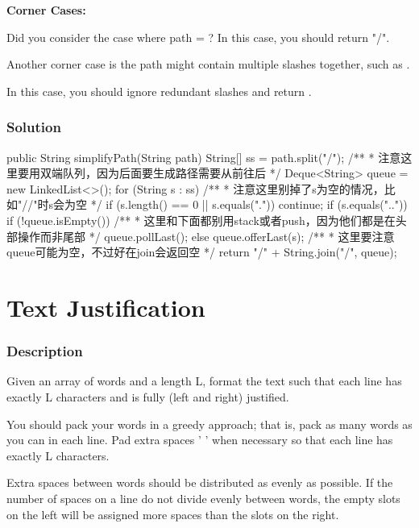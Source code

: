 \textbf{Corner Cases:}

Did you consider the case where path = ? In this case, you should return "/".

Another corner case is the path might contain multiple slashes  together, such as .

In this case, you should ignore redundant slashes and return .

\subsubsection{Solution}

\begin{Code}
public String simplifyPath(String path) {
    String[] ss = path.split("/");
    /**
     * 注意这里要用双端队列，因为后面要生成路径需要从前往后
     */
    Deque<String> queue = new LinkedList<>();
    for (String s : ss) {
        /**
         * 注意这里别掉了s为空的情况，比如"//"时s会为空
         */
        if (s.length() == 0 || s.equals(".")) {
            continue;
        }
        if (s.equals("..")) {
            if (!queue.isEmpty()) {
                /**
                 * 这里和下面都别用stack或者push，因为他们都是在头部操作而非尾部
                 */
                queue.pollLast();
            }
        } else {
            queue.offerLast(s);
        }
    }
    /**
     * 这里要注意queue可能为空，不过好在join会返回空
     */
    return "/" + String.join("/", queue);
}
\end{Code}

\newpage

\section{Text Justification} %

\subsubsection{Description}
Given an array of words and a length L, format the text such that each line has exactly L characters and is fully (left and right) justified.

You should pack your words in a greedy approach; that is, pack as many words as you can in each line. Pad extra spaces ' ' when necessary so that each line has exactly L characters.

Extra spaces between words should be distributed as evenly as possible. If the number of spaces on a line do not divide evenly between words, the empty slots on the left will be assigned more spaces than the slots on the right.

